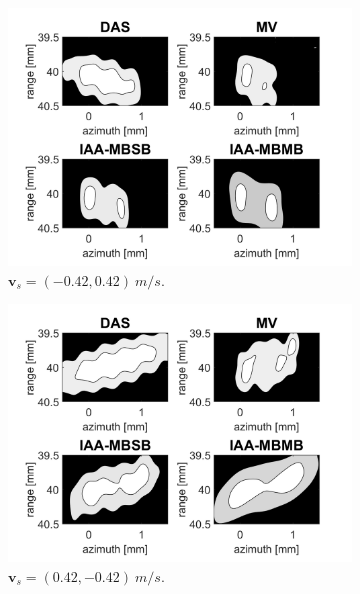 \begin{figure}[ht]
    \quad
    \begin{subfigure}[t]{0.48\linewidth}
        \includegraphics[width=\linewidth]{./images/results/4/motion_-45_-06.png}
        \caption{$\boldsymbol{v}_s = (-0.42, 0.42)~m/s$.}
        \label{fig:mla_e}
    \end{subfigure}
    \quad
    \begin{subfigure}[t]{0.48\linewidth}
        \includegraphics[width=\linewidth]{./images/results/4/motion_-45_06.png}
        \caption{$\boldsymbol{v}_s = (0.42, -0.42)~m/s$.}
        \label{fig:mla_f}
    \end{subfigure}
    \quad
    \begin{subfigure}[t]{0.48\linewidth}

\end{subfigure}
\end{figure}

